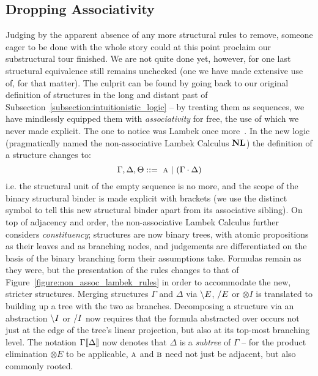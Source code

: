 \subsection{Dropping Associativity}
Judging by the apparent absence of any more structural rules to remove, someone eager to be done with the whole story could at this point proclaim our substructural tour finished.
We are not quite done yet, however, for one last structural equivalence still remains unchecked (one we have made extensive use of, for that matter).
The culprit can be found by going back to our original definition of structures in the long and distant past of Subsection~\ref{subsection:intuitionistic_logic} -- by treating them as sequences, we have mindlessly equipped them with \textit{associativity} for free, the use of which we never made explicit.
The one to notice was Lambek once more~\cite{lambek1961calculus}.
In the new logic (pragmatically named the non-associative Lambek Calculus $\textbf{NL}$) the definition of a structure changes to:
\[
	\Gamma, \Delta, \Theta ::= \ \prop{A} \ | \ (\Gamma \sbind \Delta)
\]
i.e. the structural unit of the empty sequence is no more, and the scope of the binary structural binder is made explicit with brackets (we use the distinct symbol \sbind{} to tell this new structural binder apart from its associative sibling).
On top of adjacency and order, the non-associative Lambek Calculus further considers \textit{constituency}; structures are now binary trees, with atomic propositions as their leaves and \sbind{} as branching nodes, and judgements are differentiated on the basis of the binary branching form their assumptions take.
Formulas remain as they were, but the presentation of the rules changes to that of Figure~\ref{figure:non_assoc_lambek_rules} in order to accommodate the new, stricter structures.
Merging structures $\Gamma$ and $\Delta$ via $\backslash E$, $/ E$ or $\otimes I$ is translated to building up a tree with the two as branches.
Decomposing a structure via an abstraction $\backslash I$ or $/ I$ now requires that the formula abstracted over occurs not just at the edge of the tree's linear projection, but also at its top-most branching level.
The notation $\Gamma\llbracket{\Delta}\rrbracket$ now denotes that $\Delta$ is a \textit{subtree} of $\Gamma$ -- for the product elimination $\otimes E$ to be applicable, $\prop{A}$ and $\prop{B}$ need not just be adjacent, but also commonly rooted.


